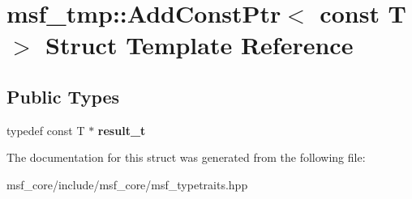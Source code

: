 \hypertarget{structmsf__tmp_1_1AddConstPtr_3_01const_01T_01_4}{\section{msf\-\_\-tmp\-:\-:Add\-Const\-Ptr$<$ const T $>$ Struct Template Reference}
\label{structmsf__tmp_1_1AddConstPtr_3_01const_01T_01_4}
}
\subsection*{Public Types}
\begin{DoxyCompactItemize}
\item 
\hypertarget{structmsf__tmp_1_1AddConstPtr_3_01const_01T_01_4_a14f5af4d2170d8a56f46e7e6447248fa}{typedef const T $\ast$ {\bfseries result\-\_\-t}}\label{structmsf__tmp_1_1AddConstPtr_3_01const_01T_01_4_a14f5af4d2170d8a56f46e7e6447248fa}

\end{DoxyCompactItemize}


The documentation for this struct was generated from the following file\-:\begin{DoxyCompactItemize}
\item 
msf\-\_\-core/include/msf\-\_\-core/msf\-\_\-typetraits.\-hpp\end{DoxyCompactItemize}
